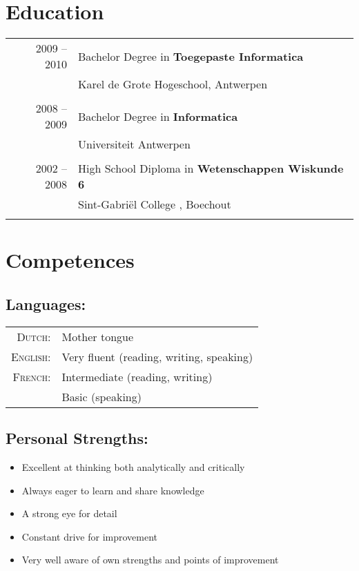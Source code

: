 \documentclass[a4paper,10pt]{article}
\begin{document}
\section{\textcolor{awesome-red}{Edu}cation}
\begin{tabular}{rl}	
2009 – 2010& Bachelor Degree in \textbf{Toegepaste Informatica}\\
& Karel de Grote Hogeschool, Antwerpen\\&\\
2008 – 2009& Bachelor Degree in \textbf{Informatica}\\
& Universiteit Antwerpen\\&\\
2002 – 2008& High School Diploma in \textbf{Wetenschappen Wiskunde 6}\\
& Sint-Gabriël College , Boechout\\&\\
\end{tabular}

\section{\textcolor{awesome-red}{Com}petences}

\subsection{Languages:}
\begin{tabular}{rl}
\textsc{Dutch:}&Mother tongue\\
\textsc{English:}&Very fluent (reading, writing, speaking)\\
\textsc{French:}&Intermediate (reading, writing) \\ & Basic (speaking)\\
\end{tabular}

\subsection{Personal Strengths:}
\begin{itemize}
\item Excellent at thinking both analytically and critically
\item Always eager to learn and share knowledge
\item A strong eye for detail
\item Constant drive for improvement
\item Very well aware of own strengths and points of improvement
\end{itemize}
\end{document}
